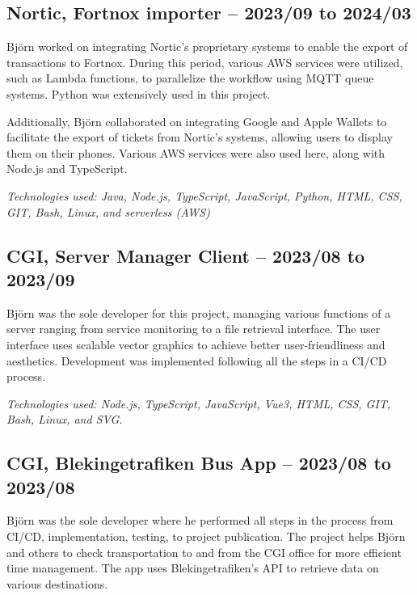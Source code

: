 \begin{minipage}[t]{0.7\textwidth}
\subsection*{\textcolor{colorTitelErfarenhet}{Nortic, Fortnox importer – 2023/09 to 2024/03}}
Björn worked on integrating Nortic's proprietary systems to enable the export of transactions to Fortnox. During this period, various AWS services were utilized, such as Lambda functions, to parallelize the workflow using MQTT queue systems. Python was extensively used in this project.

Additionally, Björn collaborated on integrating Google and Apple Wallets to facilitate the export of tickets from Nortic's systems, allowing users to display them on their phones. Various AWS services were also used here, along with Node.js and TypeScript.

\vspace{5pt}\textit{Technologies used: Java, Node.js, TypeScript, JavaScript, Python, HTML, CSS, GIT, Bash, Linux, and serverless (AWS)}

\vspace{15pt} %
\subsection*{\textcolor{colorTitelErfarenhet}{CGI, Server Manager Client – 2023/08 to 2023/09}}
Björn was the sole developer for this project, managing various functions of a server ranging from service monitoring to a file retrieval interface. The user interface uses scalable vector graphics to achieve better user-friendliness and aesthetics. Development was implemented following all the steps in a CI/CD process.

\vspace{5pt}\textit{Technologies used: Node.js, TypeScript, JavaScript, Vue3, HTML, CSS, GIT, Bash, Linux, and SVG.}

\vspace{15pt} %
\subsection*{\textcolor{colorTitelErfarenhet}{CGI, Blekingetrafiken Bus App – 2023/08 to 2023/08}}
Björn was the sole developer where he performed all steps in the process from CI/CD, implementation, testing, to project publication. The project helps Björn and others to check transportation to and from the CGI office for more efficient time management. The app uses Blekingetrafiken's API to retrieve data on various destinations.


\end{minipage}
